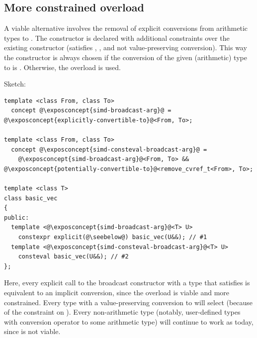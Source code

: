 \subsection{More constrained  overload}\label{sec:consteval}
A viable alternative involves the removal of explicit conversions from arithmetic types to
.
The  constructor is declared with additional constraints over the existing
constructor (satisfies , , and not value-preserving
conversion).
This way the  constructor is always chosen if the conversion of the given
(arithmetic) type to  is .
Otherwise, the  overload is used.

Sketch:
\medskip\begin{lstlisting}[style=Vc]
template <class From, class To>
  concept @\exposconcept{simd-broadcast-arg}@ = @\exposconcept{explicitly-convertible-to}@<From, To>;

template <class From, class To>
  concept @\exposconcept{simd-consteval-broadcast-arg}@ =
    @\exposconcept{simd-broadcast-arg}@<From, To> && @\exposconcept{potentially-convertible-to}@<remove_cvref_t<From>, To>;

template <class T>
class basic_vec
{
public:
  template <@\exposconcept{simd-broadcast-arg}@<T> U>
    constexpr explicit(@\seebelow@) basic_vec(U&&); // #1
  template <@\exposconcept{simd-consteval-broadcast-arg}@<T> U>
    consteval basic_vec(U&&); // #2
};
\end{lstlisting}

Here, every explicit call to the broadcast constructor with a type  that satisfies
 is equivalent to an implicit conversion, since the
 overload is viable and more constrained.
Every type with a value-preserving conversion to  will select  (because of the
constraint on ).
Every non-arithmetic type (notably, user-defined types with conversion operator to some arithmetic
type) will continue to work as today, since  is not viable.

